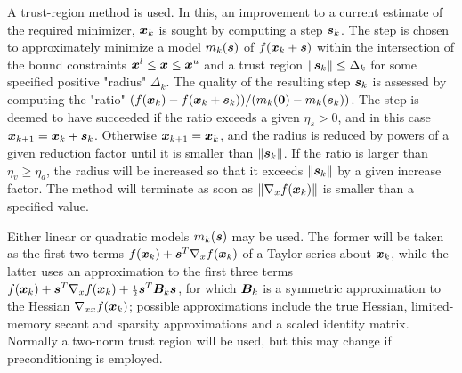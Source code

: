 \documentclass{galahad}
\begin{document}

\galmethod
A trust-region method is used. In this, an improvement to a current
estimate of the required minimizer, ${\bm{x}}_k$ is sought by computing a
step ${\bm{s}}_k$. The step is chosen to approximately minimize a model $m_k({\bm{s}})$
of $f({\bm{x}}_k + {\bm{s}})$ within the intersection of the bound constraints
${\bm{x}}^l \leq {\bm{x}} \leq {\bm{x}}^u$ and a trust region $\|{\bm{s}}_k\| \leq \Delta_k$
for some specified positive "radius" $\Delta_k$. The quality of the
resulting step ${\bm{s}}_k$ is assessed by computing the "ratio"
$(f({\bm{x}}_k) - f({\bm{x}}_k + {\bm{s}}_k))/ (m_k({\bm{0}}) - m_k({\bm{s}}_k))$.
The step is deemed to have succeeded if the ratio exceeds a given $\eta_s > 0$,
and in this case ${\bm{x}}_{k+1} = {\bm{x}}_k + {\bm{s}}_k$. Otherwise
${\bm{x}}_{k+1} = {\bm{x}}_k$, and the radius is reduced by powers of a given
reduction factor until it is smaller than $\|{\bm{s}}_k\|$. If the ratio
is larger than  $\eta_v \geq \eta_d$, the radius will be increased so that
it exceeds $\|{\bm{s}}_k\|$ by a given increase factor. The method will terminate
as soon as $\|\nabla_x f({\bm{x}}_k)\|$ is smaller than a specified value.

Either linear or quadratic models $m_k({\bm{s}})$ may be used. The former will be
taken as the first two terms $f({\bm{x}}_k) + {\bm{s}}^T \nabla_x f({\bm{x}}_k)$
of a Taylor series about ${\bm{x}}_k$, while the latter uses an
approximation to the first three terms
$f({\bm{x}}_k) + {\bm{s}}^T \nabla_x f({\bm{x}}_k) + {\scriptstyle \frac{1}{2}}
{\bm{s}}^T {\bm{B}}_k {\bm{s}}$,
for which ${\bm{B}}_k$ is a symmetric approximation to the Hessian
$\nabla_{xx} f({\bm{x}}_k)$; possible approximations include the true Hessian,
limited-memory secant and sparsity approximations and a scaled identity matrix.
Normally a two-norm trust region will be used, but this may change
if preconditioning is employed.
\end{document}
